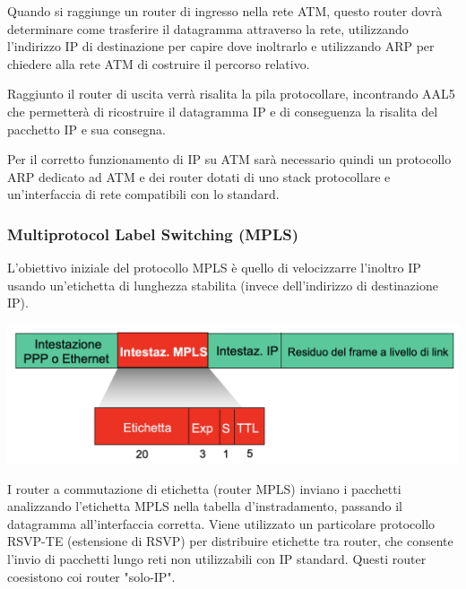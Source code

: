 \documentclass{report}
\begin{document}
Quando si raggiunge un router di ingresso nella rete ATM, questo router
dovrà determinare come trasferire il datagramma attraverso la rete,
utilizzando l'indirizzo IP di destinazione per capire dove inoltrarlo e
utilizzando ARP per chiedere alla rete ATM di costruire il percorso
relativo.

Raggiunto il router di uscita verrà risalita la pila protocollare,
incontrando AAL5 che permetterà di ricostruire il datagramma IP e di
conseguenza la risalita del pacchetto IP e sua consegna.

Per il corretto funzionamento di IP su ATM sarà necessario quindi un
protocollo ARP dedicato ad ATM e dei router dotati di uno stack
protocollare e un'interfaccia di rete compatibili con lo standard.

\hypertarget{header-n408}{%
\subsubsection{Multiprotocol Label Switching (MPLS)}\label{header-n408}}

L'obiettivo iniziale del protocollo MPLS è quello di velocizzarre
l'inoltro IP usando un'etichetta di lunghezza stabilita (invece
dell'indirizzo di destinazione IP).

\begin{center}
		\includegraphics[width=0.7\linewidth]{mpls}
	\end{center}

I router a commutazione di etichetta (router MPLS) inviano i pacchetti
analizzando l'etichetta MPLS nella tabella d'instradamento, passando il
datagramma all'interfaccia corretta. Viene utilizzato un particolare
protocollo RSVP-TE (estensione di RSVP) per distribuire etichette tra
router, che consente l'invio di pacchetti lungo reti non utilizzabili
con IP standard. Questi router coesistono coi router "solo-IP".
	
	
\end{document}
